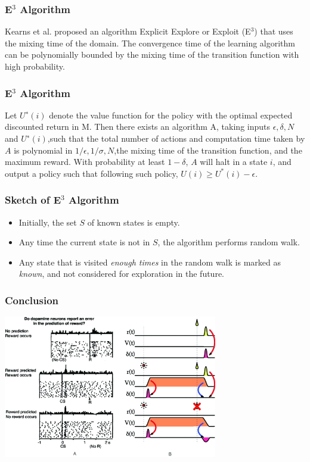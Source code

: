 \documentclass{beamer}
\begin{document}
\begin{frame}
\frametitle{E$^3$ Algorithm}
Kearns et al. proposed an algorithm Explicit Explore or Exploit
(E$^3$)\cite{kearns2002near} that uses the mixing time of the domain. The
convergence time of the learning algorithm can be polynomially bounded by the
mixing time of the transition function with high probability.
\end{frame}

\begin{frame}
\frametitle{E$^3$ Algorithm}
\begin{theorem}
Let $U^∗(i)$ denote the value function for the policy with the optimal expected
discounted return in M. Then there exists an algorithm A, taking inputs
$\epsilon,\delta,N$ and $U^∗(i)$,such  that  the  total  number  of  actions  and  computation
time  taken  by  $A$ is  polynomial  in $1/\epsilon,1/\sigma,N$,the mixing time
of the transition function, and the maximum reward. With probability at
least $1-\delta$, $A$  will halt in a state $i$, and output a policy such that
following such policy, $U(i) \geq U^*(i) - \epsilon$.
\end{theorem}
\end{frame}

\begin{frame}
\frametitle{Sketch of E$^3$ Algorithm}
\begin{itemize}
\item Initially, the set $S$ of known states is empty.
\item Any time the current state is not in $S$, the algorithm performs random
walk.
\item Any state that is visited {\em enough times} in the random walk is marked
as {\em known}, and not considered for exploration in the future.
\end{itemize}
\end{frame}

\begin{frame}
\frametitle{Conclusion}
\includegraphics[width=0.7\textwidth]{dopamine.jpg}
\end{frame}




\end{document}
